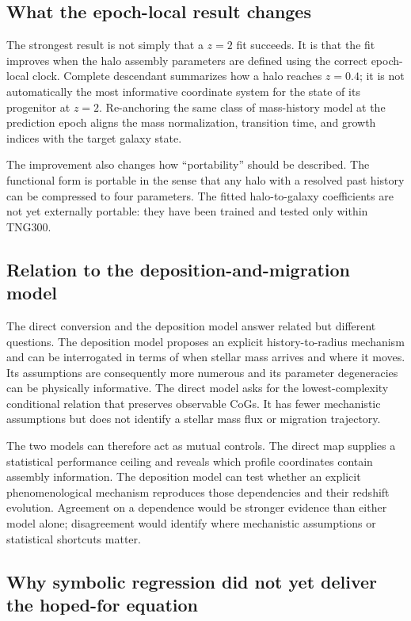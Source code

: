 \subsection{What the epoch-local result changes}

The strongest \ExpFiftyOne{} result is not simply that a $z=2$ fit succeeds. It
is that the fit improves when the halo assembly parameters are defined using
the correct epoch-local clock. Complete descendant \diffmah{} summarizes how a
halo reaches $z=0.4$; it is not automatically the most informative coordinate
system for the state of its progenitor at $z=2$. Re-anchoring the same class of
mass-history model at the prediction epoch aligns the mass normalization,
transition time, and growth indices with the target galaxy state.

The improvement also changes how ``portability'' should be described. The
functional form is portable in the sense that any halo with a resolved past
history can be compressed to four \diffmah{} parameters. The fitted
halo-to-galaxy coefficients are not yet externally portable: they have been
trained and tested only within TNG300.

\subsection{Relation to the deposition-and-migration model}

The direct conversion and the deposition model answer related but different
questions. The deposition model proposes an explicit history-to-radius
mechanism and can be interrogated in terms of when stellar mass arrives and
where it moves. Its assumptions are consequently more numerous and its
parameter degeneracies can be physically informative. The direct model asks
for the lowest-complexity conditional relation that preserves observable CoGs.
It has fewer mechanistic assumptions but does not identify a stellar mass flux
or migration trajectory.

The two models can therefore act as mutual controls. The direct map supplies a
statistical performance ceiling and reveals which profile coordinates contain
assembly information. The deposition model can test whether an explicit
phenomenological mechanism reproduces those dependencies and their redshift
evolution. Agreement on a dependence would be stronger evidence than either
model alone; disagreement would identify where mechanistic assumptions or
statistical shortcuts matter.

\subsection{Why symbolic regression did not yet deliver the hoped-for equation}

